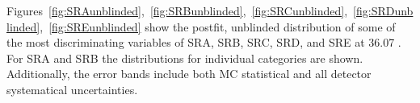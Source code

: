 
Figures~\ref{fig:SRAunblinded},~\ref{fig:SRBunblinded},~\ref{fig:SRCunblinded},~\ref{fig:SRDunblinded},~\ref{fig:SREunblinded} show the postfit, unblinded distribution of some of the most discriminating variables of SRA, SRB, SRC, SRD, and SRE at 36.07 \ifb. For SRA and SRB the distributions for individual categories are shown. Additionally, the error bands include both MC statistical and all detector systematical uncertainties. \\

%
%
%
%
%
